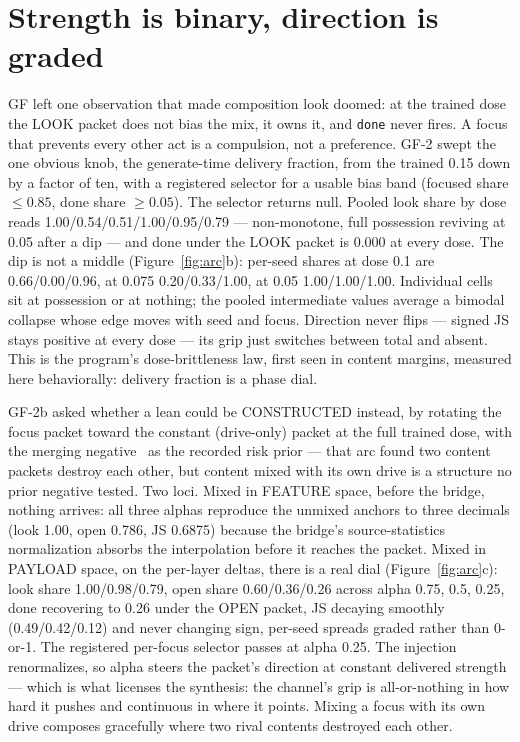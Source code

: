 \documentclass[11pt]{article}
\begin{document}
\section{Strength is binary, direction is graded}

GF left one observation that made composition look doomed: at the
trained dose the LOOK packet does not bias the mix, it owns it, and
\texttt{done} never fires. A focus that prevents every other act is
a compulsion, not a preference. GF-2 swept the one obvious knob, the
generate-time delivery fraction, from the trained 0.15 down by a
factor of ten, with a registered selector for a usable bias band
(focused share $\le 0.85$, done share $\ge 0.05$). The selector
returns null. Pooled look share by dose reads
1.00/0.54/0.51/1.00/0.95/0.79 --- non-monotone, full possession reviving at
0.05 after a dip --- and done under the LOOK packet is 0.000 at every
dose. The dip is not a middle (Figure~\ref{fig:arc}b): per-seed
shares at dose 0.1 are 0.66/0.00/0.96, at 0.075
0.20/0.33/1.00, at 0.05 1.00/1.00/1.00. Individual
cells sit at possession or at nothing; the pooled intermediate values
average a bimodal collapse whose edge moves with seed and focus.
Direction never flips --- signed JS stays positive at every dose ---
its grip just switches between total and absent. This is the
program's dose-brittleness law, first seen in content margins,
measured here behaviorally: delivery fraction is a phase dial.

GF-2b asked whether a lean could be CONSTRUCTED instead, by rotating
the focus packet toward the constant (drive-only) packet at the full
trained dose, with the merging negative~\cite{penov2026onestage} as
the recorded risk prior --- that arc found two content packets destroy
each other, but content mixed with its own drive is a structure no
prior negative tested. Two loci. Mixed in FEATURE space, before the
bridge, nothing arrives: all three alphas reproduce the unmixed anchors
to three decimals (look 1.00, open 0.786, JS
0.6875) because the bridge's source-statistics normalization
absorbs the interpolation before it reaches the packet. Mixed in
PAYLOAD space, on the per-layer deltas, there is a real dial
(Figure~\ref{fig:arc}c): look share 1.00/0.98/0.79, open share
0.60/0.36/0.26 across alpha 0.75, 0.5, 0.25, done recovering
to 0.26 under the OPEN packet, JS decaying smoothly
(0.49/0.42/0.12) and never changing sign, per-seed spreads graded
rather than 0-or-1. The registered per-focus selector passes at alpha
0.25. The injection renormalizes, so alpha steers the packet's
direction at constant delivered strength --- which is what licenses
the synthesis: the channel's grip is all-or-nothing in how hard it
pushes and continuous in where it points. Mixing a focus with its own
drive composes gracefully where two rival contents destroyed each
other.
\end{document}
